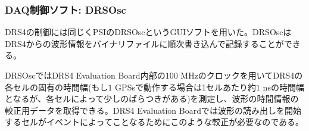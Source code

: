 \documentclass[../../main.tex]{subfiles}
\numberwithin{equation}{section}
\numberwithin{table}{section}
\numberwithin{figure}{section}
\begin{document}
    











\subsubsection{DAQ制御ソフト: DRSOsc}
  DRS4の制御には同じくPSIのDRSOscというGUIソフトを用いた。DRSOscはDRS4からの波形情報をバイナリファイルに順次書き込んで記録することができる。

  DRSOscではDRS4 Evaluation Board内部の$100$ \si{\mega\hertz}のクロックを用いてDRS4の各セルの固有の時間幅(もし$1$ GPSsで動作する場合は1セルあたり約$1$ nsの時間幅となるが、各セルによって少しのばらつきがある)を測定し、波形の時間情報の較正用データを取得できる。DRS4 Evaluation Boardでは波形の読み出しを開始するセルがイベントによってことなるためにこのような較正が必要なのである。
\end{document}
